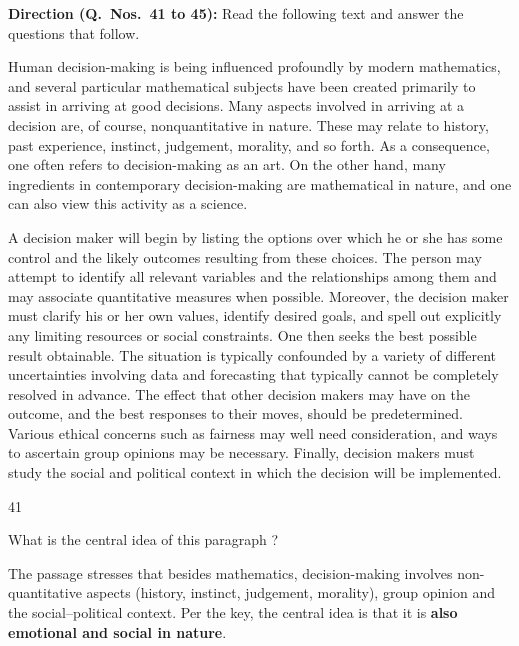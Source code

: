 \begin{context}
\textbf{Direction (Q.~Nos.~41 to 45):} Read the following text and answer the questions that follow.\par\smallskip
Human decision-making is being influenced profoundly by modern mathematics, and several particular mathematical subjects have been created primarily to assist in arriving at good decisions. Many aspects involved in arriving at a decision are, of course, nonquantitative in nature. These may relate to history, past experience, instinct, judgement, morality, and so forth. As a consequence, one often refers to decision-making as an art. On the other hand, many ingredients in contemporary decision-making are mathematical in nature, and one can also view this activity as a science.

A decision maker will begin by listing the options over which he or she has some control and the likely outcomes resulting from these choices. The person may attempt to identify all relevant variables and the relationships among them and may associate quantitative measures when possible. Moreover, the decision maker must clarify his or her own values, identify desired goals, and spell out explicitly any limiting resources or social constraints. One then seeks the best possible result obtainable. The situation is typically confounded by a variety of different uncertainties involving data and forecasting that typically cannot be completely resolved in advance. The effect that other decision makers may have on the outcome, and the best responses to their moves, should be predetermined. Various ethical concerns such as fairness may well need consideration, and ways to ascertain group opinions may be necessary. Finally, decision makers must study the social and political context in which the decision will be implemented.
\end{context}
\begin{question}{41}
{What is the central idea of this paragraph ?\par}
\begin{explain}
The passage stresses that besides mathematics, decision-making involves non-quantitative aspects (history, instinct, judgement, morality), group opinion and the social--political context. Per the key, the central idea is that it is \textbf{also emotional and social in nature}.
\end{explain}
\end{question}

